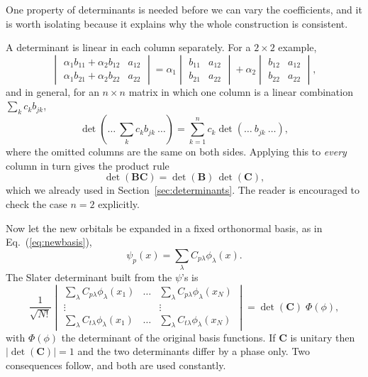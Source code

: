One property of determinants is needed before we can vary the coefficients,
and it is worth isolating because it explains why the whole construction is
consistent.

A determinant is linear in each column separately.  For a $2\times2$ example,
\begin{equation}
  \begin{vmatrix}
    \alpha_1 b_{11}+\alpha_2 b_{12} & a_{12}\\
    \alpha_1 b_{21}+\alpha_2 b_{22} & a_{22}
  \end{vmatrix}
  = \alpha_1\begin{vmatrix} b_{11} & a_{12}\\ b_{21} & a_{22}\end{vmatrix}
  + \alpha_2\begin{vmatrix} b_{12} & a_{12}\\ b_{22} & a_{22}\end{vmatrix},
  \label{eq:6-multilinear2}
\end{equation}
and in general, for an $n\times n$ matrix in which one column is a linear
combination $\sum_k c_k b_{jk}$,
\begin{equation}
  \det\left(\dots\ \textstyle\sum_k c_k b_{jk}\ \dots\right)
  = \sum_{k=1}^{n} c_k \det\left(\dots\ b_{jk}\ \dots\right),
  \label{eq:6-multilinear}
\end{equation}
where the omitted columns are the same on both sides.  Applying this to
\emph{every} column in turn gives the product rule
\begin{equation}
  \det(\bm{B}\bm{C}) = \det(\bm{B})\,\det(\bm{C}),
  \label{eq:6-productrule}
\end{equation}
which we already used in Section~\ref{sec:determinants}.  The reader is
encouraged to check the case $n=2$ explicitly.

Now let the new orbitals be expanded in a fixed orthonormal basis, as in
Eq.~(\ref{eq:newbasis}),
\begin{equation}
  \psi_p(x) = \sum_{\lambda}C_{p\lambda}\phi_{\lambda}(x).
  \label{eq:6-newbasis}
\end{equation}
The Slater determinant built from the $\psi$'s is
\begin{equation}
  \frac{1}{\sqrt{N!}}
  \begin{vmatrix}
    \sum_{\lambda}C_{p\lambda}\phi_{\lambda}(x_1) & \dots
      & \sum_{\lambda}C_{p\lambda}\phi_{\lambda}(x_N)\\
    \vdots & & \vdots\\
    \sum_{\lambda}C_{t\lambda}\phi_{\lambda}(x_1) & \dots
      & \sum_{\lambda}C_{t\lambda}\phi_{\lambda}(x_N)
  \end{vmatrix}
  = \det(\bm{C})\;\Phi(\phi),
  \label{eq:6-detcdetphi}
\end{equation}
with $\Phi(\phi)$ the determinant of the original basis functions.  If
$\bm{C}$ is unitary then $|\det(\bm{C})|=1$ and the two determinants differ by
a phase only.  Two consequences follow, and both are used constantly.

